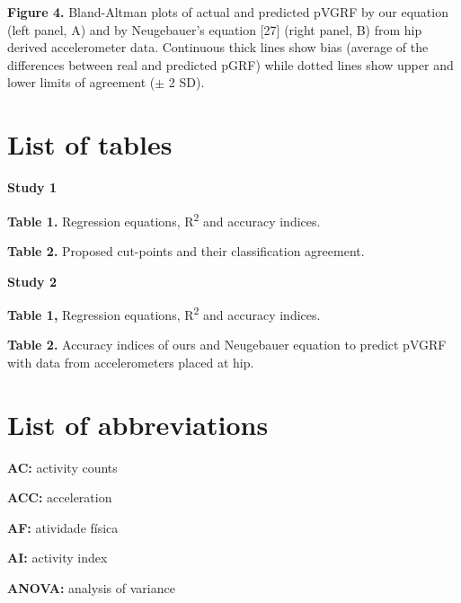 \documentclass[12pt]{article}
\def\blankpage{%
      \clearpage%
      \thispagestyle{empty}%
      \addtocounter{page}{+0}%
      \null%
      \clearpage}
\begin{document}
\noindent \textbf{Figure 4.} Bland-Altman plots of actual and predicted pVGRF by our equation (left panel, A) and by Neugebauer’s equation [27] (right panel, B) from hip derived accelerometer data. Continuous thick lines show bias (average of the differences between real and predicted pGRF) while dotted lines show upper and lower limits of agreement ($\pm$ 2 SD). 

\pagebreak

\section*{\hfil List of tables \hfil}
\vspace{0.5em}

\noindent \textbf{Study 1}
\vspace{0.5em}

\noindent \textbf{Table 1.} Regression equations, R\textsuperscript{2} and accuracy indices. 
\vspace{0.3em}

\noindent \textbf{Table 2.} Proposed cut-points and their classification agreement. 
\vspace{2em}

\noindent \textbf{Study 2}
\vspace{0.5em}

\noindent \textbf{Table 1,} Regression equations, R\textsuperscript{2} and accuracy indices. 
\vspace{0.3em}

\noindent \textbf{Table 2.} Accuracy indices of ours and Neugebauer equation to predict pVGRF with data from accelerometers placed at hip. 

\blankpage

\section*{\hfil List of abbreviations \hfil}
\vspace{0.5em}

\noindent \textbf{AC:} activity counts

\noindent \textbf{ACC:} acceleration

\noindent \textbf{AF:} atividade física

\noindent \textbf{AI:} activity index

\noindent \textbf{ANOVA:} analysis of variance
\end{document}
